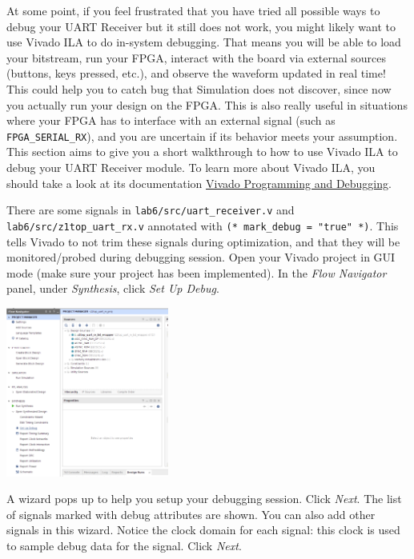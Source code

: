 \documentclass[11pt]{article}
\begin{document}
At some point, if you feel frustrated that you have tried all possible ways to debug your UART Receiver but it still does not work, you might likely want to use Vivado ILA to do in-system debugging. That means you will be able to load your bitstream, run your FPGA, interact with the board via external sources (buttons, keys pressed, etc.), and observe the waveform updated in real time! This could help you to catch bug that Simulation does not discover, since now you actually run your design on the FPGA. This is also really useful in situations where your FPGA has to interface with an external signal (such as \verb|FPGA_SERIAL_RX|), and you are uncertain if its behavior meets your assumption. This section aims to give you a short walkthrough to how to use Vivado ILA to debug your UART Receiver module. To learn more about Vivado ILA, you should take a look at its documentation \href{https://www.xilinx.com/support/documentation/sw_manuals/xilinx2019_2/ug908-vivado-programming-debugging.pdf}{Vivado Programming and Debugging}.

There are some signals in \verb|lab6/src/uart_receiver.v| and \verb|lab6/src/z1top_uart_rx.v| annotated with \verb|(* mark_debug = "true" *)|. This tells Vivado to not trim these signals during optimization, and that they will be monitored/probed during debugging session. Open your Vivado project in GUI mode (make sure your project has been implemented). In the \emph{Flow Navigator} panel, under \emph{Synthesis}, click \emph{Set Up Debug}.

\begin{center}
\includegraphics[width=0.4\textwidth]{figs/vivado-ila-1.png}
\end{center}

A wizard pops up to help you setup your debugging session. Click \emph{Next}. The list of signals marked with debug attributes are shown. You can also add other signals in this wizard. Notice the clock domain for each signal: this clock is used to sample debug data for the signal. Click \emph{Next}.
\end{document}
